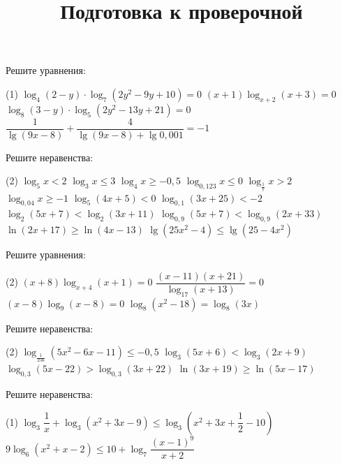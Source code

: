 \begin{class}[number=6]
	\begin{listofex}
		\item Решите уравнения: %
		\begin{tasks}(1)
			\task \( \log_4 (2-y) \cdot \log_7 (2y^2-9y+10) = 0 \)
			\task \( (x+1)\log_{x+2}(x+3)=0 \)
			\task \( \log_8 (3-y) \cdot \log_5 (2y^2-13y+21)=0 \)
			\task \( \dfrac{ 1 }{ \lg (9x-8) } + \dfrac{ 4 }{ \lg (9x-8) + \lg 0,001 } = -1 \)
		\end{tasks}
		\item Решите неравенства: %
		\begin{tasks}(2)
			\task \( \log_5 x<2 \)
			\task \( \log_3 x \le 3 \)
			\task \( \log_4 x \ge -0,5 \)
			\task \( \log_{0,123} x \le 0 \)
			\task \( \log_{\tfrac{1}{7}}x>2 \)
			\task \( \log_{0,04}x \ge -1 \)
			\task \( \log_5 (4x+5) < 0 \)
			\task \( \log_{0,1} (3x+25) < -2 \)
			\task \( \log_2(5x+7) < \log_2 (3x+11) \)
			\task \( \log_{0,9}(5x+7) < \log_{0,9} (2x+33) \)
			\task \( \ln(2x+17) \ge \ln(4x-13) \)
			\task \( \lg(25x^2-4) \le \lg(25-4x^2) \)
		\end{tasks}
	\end{listofex}
\end{class}

\begin{homework}[number=3]
	\begin{listofex}
		\item Решите уравнения: %
		\begin{tasks}(2)
			\task \( (x+8)\log_{x+4}(x+1)=0 \)
			\task \( \dfrac{ (x-11)(x+21) }{ \log_{17}(x+13) }=0 \)
			\task \( (x-8)\log_9(x-8)=0 \)
			\task \( \log_8(x^2-18)=\log_8(3x) \)
		\end{tasks}
		\item Решите неравенства: %
		\begin{tasks}(2)
			\task \( \log_{\tfrac{1}{256}}(5x^2-6x-11) \le -0,5 \)
			\task \( \log_3 (5x+6) < \log_3 (2x+9) \)
			\task \( \log_{0,3}(5x-22) > \log_{0,3}(3x+22) \)
			\task \( \ln(3x+19)\ge \ln(5x-17) \)
		\end{tasks}
	\end{listofex}
\end{homework}

\begin{class}[number=7]
	\title{Подготовка к проверочной}
	\begin{listofex}
		\item Решите неравенства:
	\begin{tasks}(1)
		\task \( \log_3 \dfrac{1}{x} + \log_3 (x^2+3x-9) \le \log_3 \left( x^2+3x+\dfrac{1}{2}-10 \right)  \)
		\task \( 9\log_6 (x^2+x-2) \le 10 + \log_7 \dfrac{(x-1)^9}{x+2} \)
	\end{tasks}
	\end{listofex}
\end{class}

